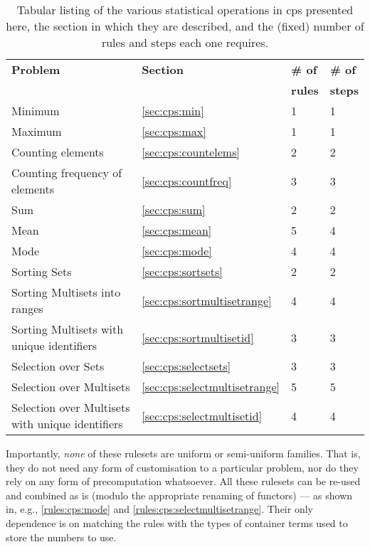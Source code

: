 \begin{table} \centering
   \begin{tabular}{|l|l|l|l|}
    \hline
    \textbf{Problem} & \textbf{Section} & \textbf{\# of} & \textbf{\# of}\\&& \textbf{rules} & \textbf{steps}\\ \hline
    Minimum & \ref{sec:cps:min} & 1 & 1 \\ %
    Maximum & \ref{sec:cps:max} & 1 & 1 \\ \hline
    Counting elements & \ref{sec:cps:countelems} & 2 & 2 \\ %
    Counting frequency of elements & \ref{sec:cps:countfreq} & 3 & 3 \\ \hline
    Sum & \ref{sec:cps:sum} & 2 & 2 \\ %
    Mean & \ref{sec:cps:mean} & 5 & 4 \\ %
    Mode & \ref{sec:cps:mode} & 4 & 4 \\ \hline
    Sorting Sets & \ref{sec:cps:sortsets} & 2 & 2 \\ %
    Sorting Multisets into ranges & \ref{sec:cps:sortmultisetrange} & 4 & 4 \\ %
    Sorting Multisets with unique identifiers & \ref{sec:cps:sortmultisetid} & 3 & 3 \\ \hline
    Selection over Sets & \ref{sec:cps:selectsets} & 3 & 3 \\ %
    Selection over Multisets & \ref{sec:cps:selectmultisetrange} & 5 & 5 \\ %
    Selection over Multisets with unique identifiers & \ref{sec:cps:selectmultisetid} & 4 & 4 \\ \hline
\end{tabular} 
\caption[Listing of various statistical operations in \gls{cps}]{\label{tab:cps:summary}Tabular listing of the various statistical operations in \gls{cps} presented here, the section in which they are described, and the (fixed) number of rules and steps each one requires.}
\end{table}

Importantly, \emph{none} of these rulesets are uniform or semi-uniform families.  That is, they do not need any form of customisation to a particular problem, nor do they rely on any form of precomputation whatsoever.  All these rulesets can be re-used and combined as is (modulo the appropriate renaming of functors) --- as shown in, e.g., \cref{rules:cps:mode} and \cref{rules:cps:selectmultisetrange}.  Their only dependence is on matching the rules with the types of container terms used to store the numbers to use.

